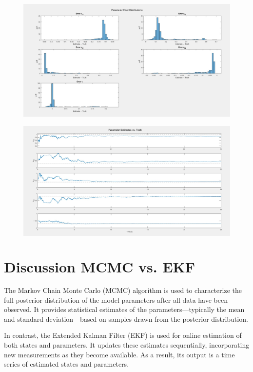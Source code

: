 \documentclass[a4paper,10pt]{report}
\begin{document}
\begin{figure}[h]
	\centering
	\includegraphics[width=\linewidth]{immagini/error_distr.jpeg}
	\caption{}
\end{figure}
\begin{figure}[h]
	\centering
	\includegraphics[width=\linewidth]{immagini/true_vs_estim.jpeg}
	\caption{}
\end{figure}

\section{Discussion MCMC vs. EKF}

The Markov Chain Monte Carlo (MCMC) algorithm is used to characterize the full posterior distribution of the model parameters after all data have been observed. It provides statistical estimates of the parameters—typically the mean and standard deviation—based on samples drawn from the posterior distribution.

In contrast, the Extended Kalman Filter (EKF) is used for online estimation of both states and parameters. It updates these estimates sequentially, incorporating new measurements as they become available. As a result, its output is a time series of estimated states and parameters.
\end{document}
